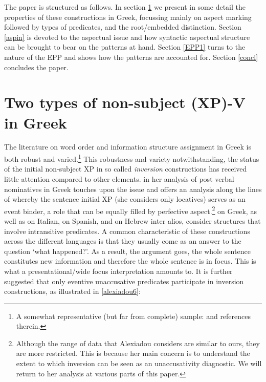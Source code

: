 \documentclass[11pt]{article}
\begin{document}
The paper is structured as follows.  In section \ref{Greeksection} we present in some detail the properties of these constructions in Greek, focussing mainly on aspect marking followed by types of predicates, and the root/embedded distinction. Section \ref{aspin} is devoted to the aspectual issue and how syntactic aspectual structure can be brought to bear on the patterns at hand.  Section \ref{EPP1} turns to the nature of the EPP and shows how the patterns are accounted for. Section \ref{concl} concludes the paper.




\section{Two types of non-subject (XP)-V in Greek} \label{Greeksection}

The literature on word order and information structure assignment in Greek is both robust and varied.\footnote{A somewhat representative (but far from complete) sample: \citet{alexiadou:99, alexiadou:00, spyropoulos-philippaki:01, georgiafentis:03, sifaki:03, roussou-tsimpli:06, gryllia:08, kechagias:10, haidou:12} and references therein.}  This robustness and variety notwithstanding, the status of the initial non-subject XP in so called \textit{inversion} constructions has received little attention compared to other elements.  \citet{alexiadou:11b}  in her analysis of post verbal nominatives in Greek touches upon the issue and offers an analysis along the lines of \citet{Borer:05a} whereby the sentence initial XP (she considers only locatives) serves as an event binder, a role that can be equally filled by perfective aspect.\footnote{Although the range of data that Alexiadou considers are similar to ours, they are more restricted.  This is because her main concern is to understand the extent to which inversion can be seen as an unaccusativity diagnostic. We will return to her analysis at various parts of this paper.}  \citet{alexiadou:96, alexiadou:11b} on Greek, as well as \citet{pinto:97} on Italian, \citet{torrego:89} on Spanish, and \citet{Borer:05a} on Hebrew inter alios, consider structures that involve intransitive predicates.  
A common characteristic of these constructions across the different languages is that they usually come as an answer to the question `what happened?'. As a result, the argument goes, the whole sentence constitutes new information and therefore the whole sentence is in focus.  This is what a presentational/wide focus interpretation amounts to.  It is further suggested that only eventive unaccusative predicates participate in inversion constructions, as illustrated in \ref{alexiadou6}:
\end{document}
